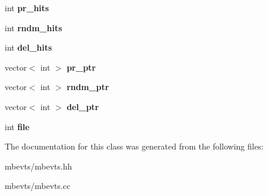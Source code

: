 \begin{DoxyCompactItemize}
\item 
\hypertarget{classmbevts_a03061f3cb086b605ddebf77737fe5eb0}{int {\bfseries pr\-\_\-hits}}\label{classmbevts_a03061f3cb086b605ddebf77737fe5eb0}

\item 
\hypertarget{classmbevts_a33b7c77a5fe645bfdcb8dc581769e3b7}{int {\bfseries rndm\-\_\-hits}}\label{classmbevts_a33b7c77a5fe645bfdcb8dc581769e3b7}

\item 
\hypertarget{classmbevts_a0780adbd09772dced2042b7067ace74e}{int {\bfseries del\-\_\-hits}}\label{classmbevts_a0780adbd09772dced2042b7067ace74e}

\item 
\hypertarget{classmbevts_ae0c8c3d4303a43f843cd3eda12cfb9e5}{vector$<$ int $>$ {\bfseries pr\-\_\-ptr}}\label{classmbevts_ae0c8c3d4303a43f843cd3eda12cfb9e5}

\item 
\hypertarget{classmbevts_aea8371f283b731fdba6e3af0e9a74852}{vector$<$ int $>$ {\bfseries rndm\-\_\-ptr}}\label{classmbevts_aea8371f283b731fdba6e3af0e9a74852}

\item 
\hypertarget{classmbevts_ac5f29344cdf6ba222e9ccd437542ca16}{vector$<$ int $>$ {\bfseries del\-\_\-ptr}}\label{classmbevts_ac5f29344cdf6ba222e9ccd437542ca16}

\item 
\hypertarget{classmbevts_ab0eb943464d109e2218004991e175938}{int {\bfseries file}}\label{classmbevts_ab0eb943464d109e2218004991e175938}

\end{DoxyCompactItemize}


The documentation for this class was generated from the following files\-:\begin{DoxyCompactItemize}
\item 
mbevts/mbevts.\-hh\item 
mbevts/mbevts.\-cc\end{DoxyCompactItemize}
